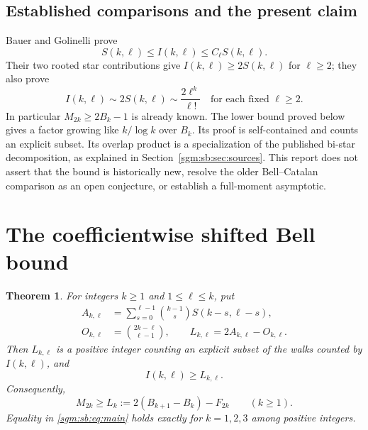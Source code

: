 \documentclass[11pt,letterpaper]{article}
\newtheorem{theorem}{Theorem}[section]
\theoremstyle{remark}\newtheorem{remark}[theorem]{Remark}
\theoremstyle{definition}\newtheorem{definition}[theorem]{Definition}
\begin{document}
\subsection{Established comparisons and the present claim}
Bauer and Golinelli prove~\cite[\S5.5, Eq.\ (9)]{bg}
\begin{equation}\label{sgm:sb:eq:bg}
 S(k,\ell)\le I(k,\ell)\le C_\ell S(k,\ell).
\end{equation}
Their two rooted star contributions give $I(k,\ell)\ge2S(k,\ell)$ for $\ell\ge2$; they also prove~\cite[\S5.6, Eq.\ (13)]{bg}
\begin{equation}\label{sgm:sb:eq:fixed}
 I(k,\ell)\sim2S(k,\ell)\sim\frac{2\ell^k}{\ell!}
 \quad\text{for each fixed }\ell\ge2.
\end{equation}
In particular $M_{2k}\ge2B_k-1$ is already known. The lower bound proved below gives a factor growing like $k/\log k$ over $B_k$. Its proof is self-contained and counts an explicit subset. Its overlap product is a specialization of the published bi-star decomposition, as explained in Section~\ref{sgm:sb:sec:sources}. This report does not assert that the bound is historically new, resolve the older Bell--Catalan comparison as an open conjecture, or establish a full-moment asymptotic.

\section{The coefficientwise shifted Bell bound}
\begin{theorem}\label{sgm:sb:thm:main}
For integers $k\ge1$ and $1\le\ell\le k$, put
\begin{align}
 A_{k,\ell}&=\sum_{s=0}^{\ell-1}\binom{k-1}{s}S(k-s,\ell-s),\label{sgm:sb:eq:Akl}\\
 O_{k,\ell}&=\binom{2k-\ell}{\ell-1},\qquad
 L_{k,\ell}=2A_{k,\ell}-O_{k,\ell}.\label{sgm:sb:eq:Okl}
\end{align}
Then $L_{k,\ell}$ is a positive integer counting an explicit subset of the walks counted by $I(k,\ell)$, and
\begin{equation}\label{sgm:sb:eq:coef}
 I(k,\ell)\ge L_{k,\ell}.
\end{equation}
Consequently,
\begin{equation}\label{sgm:sb:eq:main}
 M_{2k}\ge L_k:=2(B_{k+1}-B_k)-F_{2k}\qquad(k\ge1).
\end{equation}
Equality in \eqref{sgm:sb:eq:main} holds exactly for $k=1,2,3$ among positive integers.
\end{theorem}
\end{document}
